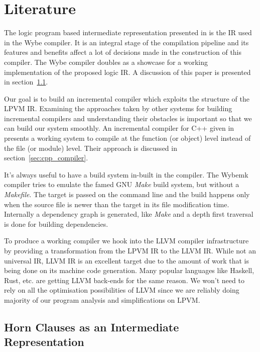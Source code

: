 \chapter{Literature}
\label{chap:literature_review}


The logic program based intermediate representation presented in
\cite{lpvm2015} is the IR used in the Wybe compiler. It is an integral stage of
the compilation pipeline and its features and benefits affect a lot of
decisions made in the construction of this compiler. The Wybe compiler doubles
as a showcase for a working implementation of the proposed logic IR. A
discussion of this paper is presented in section~\ref{sec:horn_clauses}.

Our goal is to build an incremental compiler which exploits the structure of
the LPVM IR. Examining the approaches taken by other systems for building
incremental compilers and understanding their obstacles is important so that we
can build our system smoothly. An incremental compiler for C++ given in
\cite{cpp_compiler} presents a working system to compile at the function (or
object) level instead of the file (or module) level. Their approach is
discussed in section~\ref{sec:cpp_compiler}.


It's always useful to have a build system in-built in the compiler. The Wybemk
compiler tries to emulate the famed GNU \textit{Make} \citep{make} build
system, but without a \textit{Makefile}. The target is passed on the command
line and the build happens only when the source file is newer than the target
in its file modification time. Internally a dependency graph is generated, like
\textit{Make} and a depth first traversal is done for building dependencies. 


To produce a working compiler we hook into the LLVM compiler infrastructure
\citep{Lattner:MSThesis02} by providing a transformation from the LPVM IR to
the LLVM IR. While not an universal IR, LLVM IR is an excellent target due to
the amount of work that is being done on its machine code generation. Many
popular languages like Haskell, Rust, etc. are getting LLVM back-ends for the
same reason. We won't need to rely on all the optimisation possibilities of
LLVM since we are reliably doing majority of our program analysis and
simplifications on LPVM. 


\section{Horn Clauses as an Intermediate Representation \citep{lpvm2015}}
\label{sec:horn_clauses}


